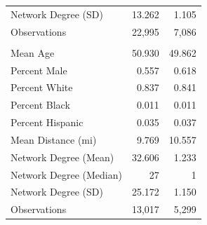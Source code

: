 \begin{tabular}{lrr}
\hspace{1em}Network Degree (SD) & 13.262 & 1.105\\
\hspace{1em}Observations & 22,995 & 7,086\\
\addlinespace[0.3em]
\multicolumn{3}{l}{\textbf{Dermatology}}\\
\hspace{1em}Mean Age & 50.930 & 49.862\\
\hspace{1em}Percent Male & 0.557 & 0.618\\
\hspace{1em}Percent White & 0.837 & 0.841\\
\hspace{1em}Percent Black & 0.011 & 0.011\\
\hspace{1em}Percent Hispanic & 0.035 & 0.037\\
\hspace{1em}Mean Distance (mi) & 9.769 & 10.557\\
\hspace{1em}Network Degree (Mean) & 32.606 & 1.233\\
\hspace{1em}Network Degree (Median) & 27 & 1\\
\hspace{1em}Network Degree (SD) & 25.172 & 1.150\\
\hspace{1em}Observations & 13,017 & 5,299\\
\bottomrule
\end{tabular}
